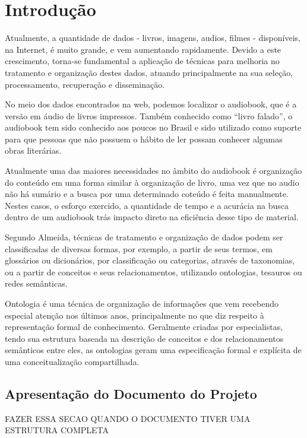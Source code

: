 \chapter[Introdução]{Introdução}\label{cap1}
		
Atualmente, a quantidade de dados - livros, imagens, audios, filmes - disponíveis, na Internet, é muito grande, e vem aumentando rapidamente. Devido a este crescimento, torna-se fundamental a aplicação de técnicas para melhoria no tratamento e organização destes dados, atuando principalmente na sua seleção, processamento, recuperação e disseminação.\cite{UVG}

No meio dos dados encontrados na web, podemos localizar o audiobook, que é a versão em áudio de livros impressos. Também conhecido como “livro falado”, o audiobook tem sido conhecido aos poucos no Brasil e sido utilizado como suporte para que pessoas que não possuem o hábito de ler possam conhecer algumas obras literárias.

Atualmente uma das maiores necessidades no âmbito do audiobook é organização do conteúdo em uma forma similar à organização de livro, uma vez que no audio não há sumário e a busca por uma determinado coteúdo é feita manualmente. Nestes casos, o esforço exercido, a quantidade de tempo e a acurácia na busca dentro de um audiobook trás impacto direto na eficiência desse tipo de material.

Segundo Almeida\cite{UVG}, técnicas de tratamento e organização de dados podem ser classificadas de diversas formas, por exemplo, a partir de seus termos, em glossários ou dicionários, por classificação ou categorias, através de taxonomias, ou a partir de conceitos e seus relacionamentos, utilizando ontologias, tesauros ou redes semânticas.\cite{TSW}

Ontologia é uma técnica de organização de informações que vem recebendo especial atenção nos últimos anos, principalmente no que diz respeito à representação formal de conhecimento. Geralmente criadas por especialistas, tendo sua estrutura baseada na descrição de conceitos e dos relacionamentos semânticos entre eles, as ontologias geram uma especificação formal e explícita de uma conceitualização compartilhada.


\section{Apresentação do Documento do Projeto}

FAZER ESSA SECAO QUANDO O DOCUMENTO TIVER UMA ESTRUTURA COMPLETA


